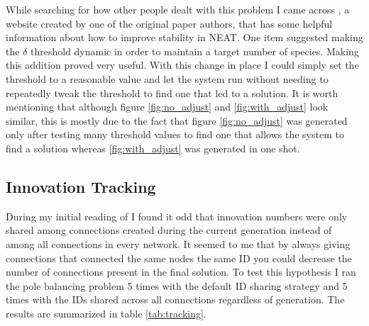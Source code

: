 \documentclass[twocolumn,letterpaper]{article}
\begin{document}
While searching for how other people dealt with this problem I came across \cite{neat_web}, a website created
by one of the original paper authors, that has some helpful information about how to improve stability in
NEAT. One item suggested making the $\delta$ threshold dynamic in order to maintain a target number of
species. Making this addition proved very useful. With this change in place I could simply set the threshold to 
a reasonable value and let the system run without needing to repeatedly tweak the threshold to find one that led to a solution. It is worth mentioning that although figure \ref{fig:no_adjust} and 
\ref{fig:with_adjust} look similar, this is mostly due to the fact that figure \ref{fig:no_adjust} was
generated only after testing many threshold values to find one that allows the system to find a solution
whereas \ref{fig:with_adjust} was generated in one shot.
 
\subsection{Innovation Tracking} \label{sec:innovations}
During my initial reading of \cite{neat_paper} I found it odd that innovation numbers were only shared among
connections created during the current generation instead of among all connections in every network. It seemed to me that by always giving connections that connected the same nodes the same ID you could decrease the
number of connections present in the final solution. To test this hypothesis I ran the pole balancing problem
5 times with the default ID sharing strategy and 5 times with the IDs shared across all connections 
regardless of generation. The results are summarized in table \ref{tab:tracking}.

\begin{table}[]
	\centering
	\caption{Effects of sharing IDs within each generation compared to each run.}
	\label{tab:tracking}
\end{table}
\end{document}

